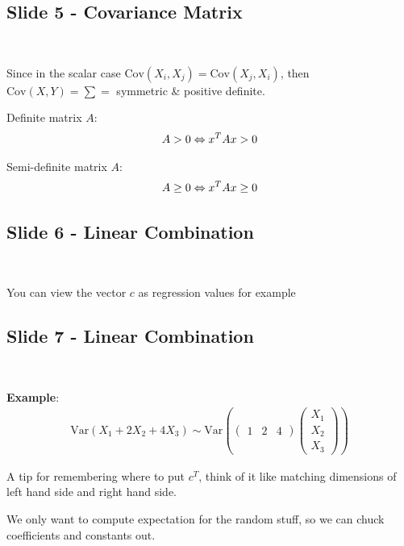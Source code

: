 \subsection{Slide 5 - Covariance Matrix}\hfill\\
\par\bigskip
\noindent Since in the scalar case $\text{Cov}\left(X_i,X_j\right) = \text{Cov}\left(X_j,X_i\right)$, then $\text{Cov}\left(X,Y\right) = \sum = $ symmetric \& positive definite.
\par\bigskip
\begin{theo}{}
  Definite matrix $A$:
  \begin{equation*}
    \begin{gathered}
      A>0\Leftrightarrow x^TAx>0
    \end{gathered}
  \end{equation*}
  \par\bigskip
  Semi-definite matrix $A$:
  \begin{equation*}
    \begin{gathered}
      A\geq0\Leftrightarrow x^TAx\geq0
    \end{gathered}
  \end{equation*}
\end{theo}
\par\bigskip
\subsection{Slide 6 - Linear Combination}\hfill\\
\par\bigskip
\noindent You can view the vector $c$ as regression values for example
\par\bigskip
\subsection{Slide 7 - Linear Combination}\hfill\\
\par\bigskip
\noindent\textbf{Example}:
\begin{equation*}
  \begin{gathered}
    \text{Var}\left(X_1+2X_2+4X_3\right)\sim \text{Var}\left(\begin{pmatrix}1&2&4\end{pmatrix}\begin{pmatrix}X_1\\X_2\\X_3\end{pmatrix}\right)
  \end{gathered}
\end{equation*}
\par\bigskip
\noindent A tip for remembering where to put $c^T$, think of it like matching dimensions of left hand side and right hand side.
\par\bigskip
\noindent We only want to compute expectation for the random stuff, so we can chuck coefficients and constants out.
\par\bigskip
